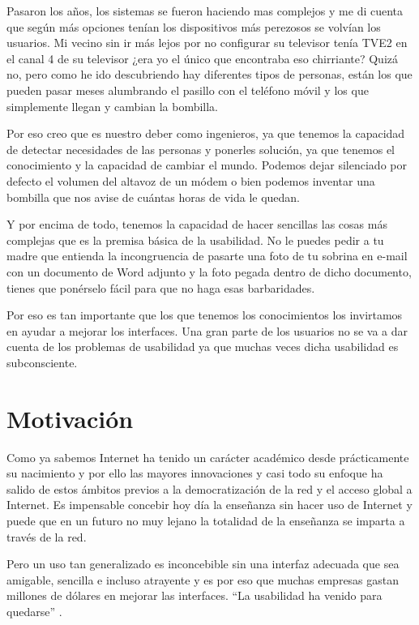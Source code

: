 \bigskip
Pasaron los años, los sistemas se fueron haciendo mas complejos y me di cuenta que según más opciones tenían los dispositivos más perezosos se volvían los usuarios. Mi vecino sin ir más lejos por no configurar su televisor tenía TVE2 en el canal 4 de su televisor ¿era yo el único que encontraba eso chirriante? Quizá no, pero como he ido descubriendo hay diferentes tipos de personas, están los que pueden pasar meses alumbrando el pasillo con el teléfono móvil y los que simplemente llegan y cambian la bombilla.

\bigskip
Por eso creo que es nuestro deber como ingenieros, ya que tenemos la capacidad de detectar necesidades de las personas y ponerles solución, ya que tenemos el conocimiento y la capacidad de cambiar el mundo. Podemos dejar silenciado por defecto el volumen del altavoz de un módem o bien podemos inventar una bombilla que nos avise de cuántas horas de vida le quedan.

\bigskip
Y por encima de todo, tenemos la capacidad de hacer sencillas las cosas más complejas que es la premisa básica de la usabilidad. No le puedes pedir a tu madre que entienda la incongruencia de pasarte una foto de tu sobrina en e-mail con un documento de Word adjunto y la foto pegada dentro de dicho documento, tienes que ponérselo fácil para que no haga esas barbaridades.

\bigskip
Por eso es tan importante que los que tenemos los conocimientos los invirtamos en ayudar a mejorar los interfaces. Una gran parte de los usuarios no se va a dar cuenta de los problemas de usabilidad ya que muchas veces dicha usabilidad es subconsciente.

\section{Motivación}

Como ya sabemos Internet ha tenido un carácter académico desde prácticamente su nacimiento y por ello las mayores innovaciones y casi todo su enfoque ha salido de estos ámbitos previos a la democratización de la red y el acceso global a Internet. Es impensable concebir hoy día la enseñanza sin hacer uso de Internet y puede que en un futuro no muy lejano la totalidad de la enseñanza se imparta a través de la red.

\bigskip
Pero un uso tan generalizado es inconcebible sin una interfaz adecuada que sea amigable, sencilla e incluso atrayente y es por eso que muchas empresas gastan millones de dólares en mejorar las interfaces. ``La usabilidad ha venido para quedarse'' \cite{jakonielsen}.

